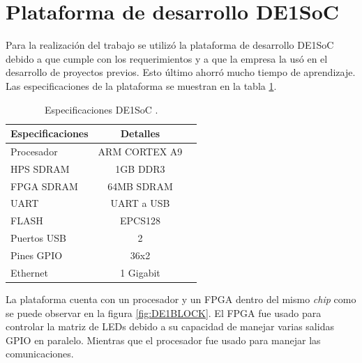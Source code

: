 \section{ Plataforma de desarrollo DE1SoC}
Para la realización del trabajo se utilizó la plataforma de desarrollo DE1SoC debido a que cumple con los requerimientos y a que la empresa la usó en el desarrollo de proyectos previos. Esto último ahorró mucho tiempo de aprendizaje. Las especificaciones de la plataforma se muestran en la tabla \ref{tab:DE1SOCTABLA}.

\begin{table}[h]
\centering
\caption[Especificaciones DE1SoC]{Especificaciones DE1SoC \protect\footnotemark.}
\begin{tabular}{l c c}
\toprule
\textbf{Especificaciones}& \textbf{Detalles}\\
\midrule 


Procesador & ARM CORTEX A9\\
HPS SDRAM & 1GB DDR3\\
FPGA SDRAM & 64MB SDRAM\\
UART & UART a USB\\
FLASH & EPCS128\\
Puertos USB & 2\\
Pines GPIO & 36x2\\
Ethernet & 1 Gigabit\\


\bottomrule
\hline
\end{tabular}
\label{tab:DE1SOCTABLA}
\end{table}


La plataforma cuenta con un procesador y un FPGA dentro del mismo \textit{chip} como se puede observar en la figura  \ref{fig:DE1BLOCK}. El FPGA fue usado para controlar la matriz de LEDs debido a su capacidad de manejar varias salidas GPIO en paralelo. Mientras que el procesador fue usado para manejar las comunicaciones.

